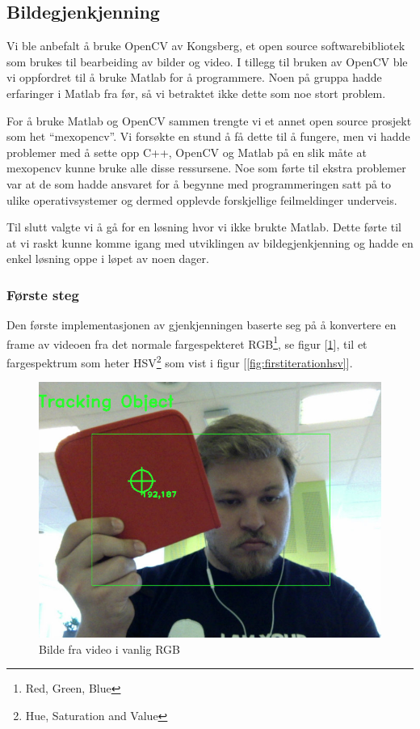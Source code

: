 \subsection{Bildegjenkjenning}

Vi ble anbefalt å bruke OpenCV av Kongsberg, et open source softwarebibliotek som brukes til bearbeiding av bilder og video. I tillegg til bruken av OpenCV ble vi oppfordret til å bruke Matlab for å programmere. Noen på gruppa hadde erfaringer i Matlab fra før, så vi betraktet ikke dette som noe stort problem.

For å bruke Matlab og OpenCV sammen trengte vi et annet open source prosjekt som het ``mexopencv''. Vi forsøkte en stund å få dette til å fungere, men vi hadde problemer med å sette opp C++, OpenCV og Matlab på en slik måte at mexopencv kunne bruke alle disse ressursene. Noe som førte til ekstra problemer var at de som hadde ansvaret for å begynne med programmeringen satt på to ulike operativsystemer og dermed opplevde forskjellige feilmeldinger underveis. 

Til slutt valgte vi å gå for en løsning hvor vi ikke brukte Matlab. Dette førte til at vi raskt kunne komme igang med utviklingen av bildegjenkjenning og hadde en enkel løsning oppe i løpet av noen dager.

\subsubsection{Første steg}

Den første implementasjonen av gjenkjenningen baserte seg på å konvertere en frame av videoen fra det normale fargespekteret RGB\footnote{Red, Green, Blue}, se figur [\ref{fig:firstiterationrgb}], til et fargespektrum som heter HSV\footnote{Hue, Saturation and Value} som vist i figur [\ref{fig:firstiterationhsv}].

\begin{figure}[h!]
	\centering
	\includegraphics[scale=0.45]{img/first-rgb.jpg}
	\caption[Første iterasjon RGB bilde]{Bilde fra video i vanlig RGB}
	\label{fig:firstiterationrgb}
\end{figure}

